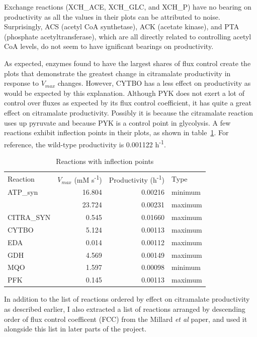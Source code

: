 \documentclass[parskip=full]{scrreprt}
\begin{document}
Exchange reactions (XCH\_ACE, XCH\_GLC, and XCH\_P) have no bearing on productivity as all the values in their plots can be attributed to noise. Surprisingly, ACS (acetyl CoA synthetase), ACK (acetate kinase), and PTA (phosphate acetyltransferase), which are all directly related to controlling acetyl CoA levels, do not seem to have ignificant bearings on productivity.

As expected, enzymes found to have the largest shares of flux control create the plots that demonstrate the greatest change in citramalate productivity in response to $V_{max}$ changes. However, CYTBO has a less effect on productivity as would be expected by this explanation. Although PYK does not exert a lot of control over fluxes as expected by its flux control coefficient, it has quite a great effect on citramalate productivity. Possibly it is because the citramalate reaction uses up pyruvate and because PYK is a control point in glycolysis. A few reactions exhibit inflection points in their plots, as shown in table~\ref{tab:inflection}. For reference, the wild-type productivity is 0.001122 h\textsuperscript{-1}. %

\begin{table}[htbp]
  \caption{Reactions with inflection points}
  \label{tab:inflection}
  \centering
  \begin{tabular}{lrrl}
    Reaction & $V_{max}$ (mM s\textsuperscript{-1}) & Productivity (h\textsuperscript{-1}) & Type\\
    ATP\_syn & 16.804 & 0.00216 & minimum\\
    & 23.724 & 0.00231 & maximum\\
    CITRA\_SYN & 0.545 & 0.01660 & maximum\\
    CYTBO & 5.124 & 0.00113 & maximum\\
    EDA & 0.014 & 0.00112 & maximum\\
    GDH & 4.569 & 0.00149 & maximum\\
    MQO & 1.597 & 0.00098 & minimum\\
    PFK & 0.145 & 0.00113 & maximum
  \end{tabular}
\end{table}

In addition to the list of reactions ordered by effect on citramalate productivity as described earlier, I also extracted a list of reactions arranged by descending order of flux control coefficent (FCC) from the Millard \emph{et al} paper, and used it alongside this list in later parts of the project.
\end{document}
